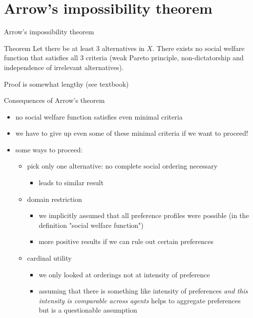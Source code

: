 \documentclass[bigger]{beamer}
\begin{document}
\section{Arrow's  impossibility theorem}
\label{sec:org8ee989e}
\begin{frame}[label={sec:orgf9bd553}]{Arrow's impossibility theorem}
\begin{block}{Theorem}
Let there be at least 3 alternatives in \(X\). There exists no social welfare function that satisfies all 3 criteria (weak Pareto principle, non-dictatorship and independence of irrelevant alternatives). 
\end{block}

Proof is somewhat lengthy (see textbook)
\end{frame}
\begin{frame}[label={sec:orgf3e6af3}]{Consequences  of Arrow's theorem}
\begin{itemize}
\item no social welfare function satisfies even minimal criteria
\item we have to give up even some of these minimal criteria if we want to proceed!
\item some ways to proceed:
\begin{itemize}
\item pick only one alternative: no complete social ordering necessary
\begin{itemize}
\item leads to similar result
\end{itemize}
\item domain restriction
\begin{itemize}
\item we implicitly assumed that all preference profiles were possible (in the definition "social welfare function")
\item more positive results if we can rule out certain preferences
\end{itemize}
\item cardinal utility
\begin{itemize}
\item we only looked at orderings not at intensity of preference
\item assuming that there is something like intensity of preferences \emph{and this intensity is comparable across agents} helps to aggregate preferences but is a questionable assumption
\end{itemize}
\end{itemize}
\end{itemize}
\end{frame}
\end{document}
